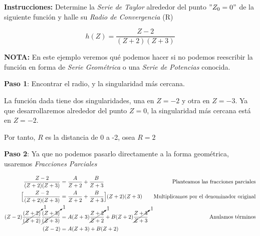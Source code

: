 \textbf{Instrucciones:} Determine la \textit{Serie de Taylor} alrededor del punto $"Z_0 = 0"$ de la siguiente función y halle su \textit{Radio de Convergencia} (R)

\[ h(Z) = \frac{Z-2}{(Z+2)(Z+3)} \]

\textbf{NOTA:} En este ejemplo veremos qué podemos hacer si no podemos reescribir la función en forma de \textit{Serie Geométrica} o una \textit{Serie de Potencias} conocida.

\textbf{Paso 1}: Encontrar el radio, y la singularidad más cercana.

La función dada tiene dos singularidades, una en $Z = -2$ y otra en $Z = -3$. Ya que desarrollaremos alrededor del punto $Z=0$, la singularidad más cercana está en $Z = -2$.

Por tanto, $R$ es la distancia de 0 a -2, osea $R = 2$

\textbf{Paso 2}:
Ya que no podemos pasarlo directamente a la forma geométrica, usaremos \textit{Fracciones Parciales}

\begin{align}
    \frac{Z-2}{(Z+2)(Z+3)} &= \frac{A}{Z+2} + \frac{B}{Z+3}
        &\text{ Planteamos las fracciones parciales} \nonumber \\
    \Bigl[
            \frac{Z-2}{(Z+2)(Z+3)} &= \frac{A}{Z+2} + \frac{B}{Z+3}
        \Bigr] (Z+2)(Z+3)
        & \text{Multiplicamos por el denominador original} \nonumber \\
    (Z-2) \cancelto{1}{\frac{(Z+2)}{(Z+2)}} \cancelto{1}{\frac{(Z+3)}{(Z+3)}}
        &=A(Z+3) \cancelto{1}{\frac{Z+2}{Z+2}} 
        + B(Z+2)\cancelto{1}{\frac{Z+3}{Z+3}}
        & \text{Anulamos términos} \nonumber \\
    (Z-2) &= A(Z+3) + B(Z+2)
\end{align}

